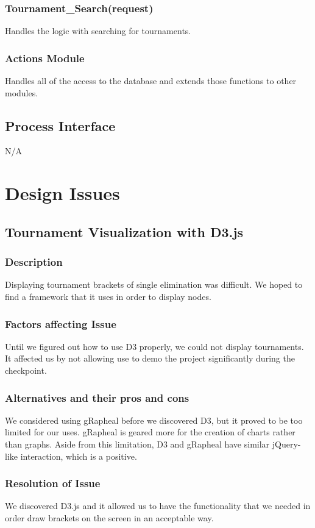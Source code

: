 \documentclass{article}
\begin{document}
\subsubsection{Tournament\_Search(request)}
Handles the logic with searching for tournaments.
\subsubsection{Actions Module}
Handles all of the access to the database and extends those functions to other modules. 
\subsection{Process Interface}
N/A



\newpage
\section{Design Issues}
\subsection{Tournament Visualization with D3.js}
\subsubsection{Description}
Displaying tournament brackets of single elimination was difficult. We hoped to find a framework that it uses in order to display nodes.

\subsubsection{Factors affecting Issue}
Until we figured out how to use D3 properly, we could not display tournaments. It affected us by not allowing use to demo the project significantly during the checkpoint.

\subsubsection{Alternatives and their pros and cons}
We considered using gRapheal before we discovered D3, but it proved to be too limited for our uses. gRapheal is geared more for the creation of charts rather than graphs. Aside from this limitation, D3 and gRapheal have similar jQuery-like interaction, which is a positive.

\subsubsection{Resolution of Issue}
We discovered D3.js and it allowed us to have the functionality that we needed in order draw brackets on the screen in an acceptable way.
\end{document}
